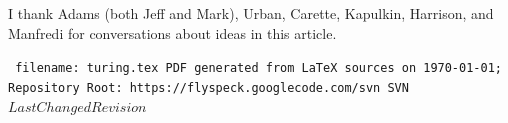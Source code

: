 \documentclass{llncs}
\def\svninfo{{\tt
  filename: turing.tex\hfill\break
  PDF generated from LaTeX sources on \today; \hfill\break
  Repository Root: https://flyspeck.googlecode.com/svn \hfill\break
  SVN $LastChangedRevision$
  }
  }
\begin{document}
\bigskip

I thank Adams (both Jeff and Mark), Urban, Carette, Kapulkin, Harrison, and Manfredi for conversations
about ideas in this article.


\raggedright



\bigskip
\noindent
\svninfo
\smallskip

\noindent
\end{document}
